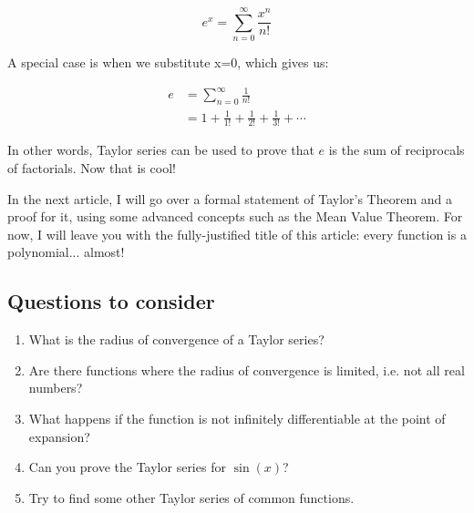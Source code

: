 \documentclass{article}
\begin{document}
$$
e^x = \sum_{n=0}^{\infty} \frac{x^n}{n!}
$$

A special case is when we substitute x=0, which gives us:

\begin{align*}
e &= \sum_{n=0}^{\infty} \frac{1}{n!} \\
    &= 1 + \frac{1}{1!} + \frac{1}{2!} + \frac{1}{3!} + \cdots
\end{align*}

In other words, Taylor series can be used to prove that $e$ is the sum of reciprocals of factorials. Now that is cool!

In the next article, I will go over a formal statement of Taylor's Theorem and a proof for it, using some advanced concepts such as the Mean Value Theorem. For now, I will leave you with the fully-justified title of this article: every function is a polynomial... almost!

\subsection*{Questions to consider}

\begin{enumerate}
    \item What is the radius of convergence of a Taylor series?
    \item Are there functions where the radius of convergence is limited, i.e. not all real numbers?
    \item What happens if the function is not infinitely differentiable at the point of expansion?
    \item Can you prove the Taylor series for $\sin(x)$?
    \item Try to find some other Taylor series of common functions.
\end{enumerate}
\end{document}
